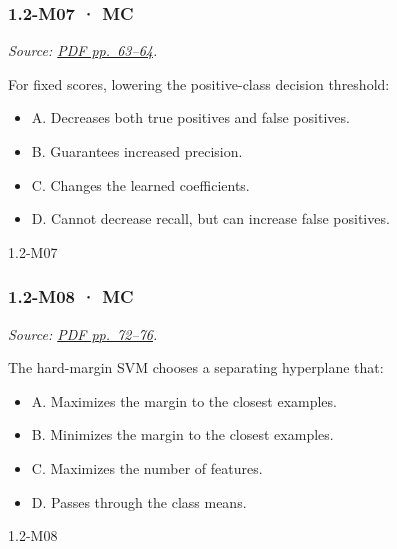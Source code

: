 \noindent\begin{minipage}{\linewidth}

\subsubsection{1.2-M07 · MC}\label{m07-mc-1}

\emph{Source:
\href{../Lecture\%20Slides/1.2.\%20Shallow\%20Learning.pdf\#page=63}{PDF
pp.~63--64}.}

For fixed scores, lowering the positive-class decision threshold:

\begin{itemize}
\tightlist
\item
  A. Decreases both true positives and false positives.
\item
  B. Guarantees increased precision.
\item
  C. Changes the learned coefficients.
\item
  D. Cannot decrease recall, but can increase false positives.
\end{itemize}

\begin{solution}[8mm]{1.2-M07}

\end{solution}
\end{minipage}\par\medskip

\noindent\begin{minipage}{\linewidth}

\subsubsection{1.2-M08 · MC}\label{m08-mc-1}

\emph{Source:
\href{../Lecture\%20Slides/1.2.\%20Shallow\%20Learning.pdf\#page=72}{PDF
pp.~72--76}.}

The hard-margin SVM chooses a separating hyperplane that:

\begin{itemize}
\tightlist
\item
  A. Maximizes the margin to the closest examples.
\item
  B. Minimizes the margin to the closest examples.
\item
  C. Maximizes the number of features.
\item
  D. Passes through the class means.
\end{itemize}

\begin{solution}[8mm]{1.2-M08}

\end{solution}
\end{minipage}\par\medskip

